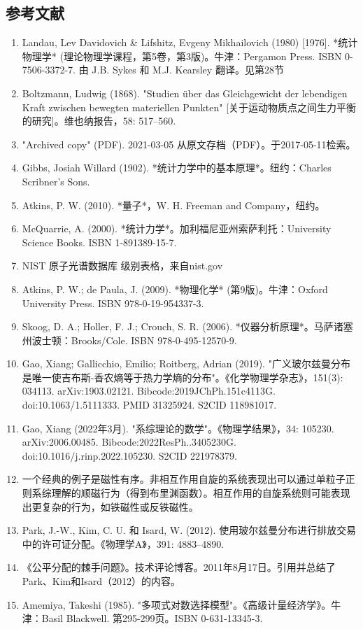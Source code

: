 \subsection{参考文献}  
\begin{enumerate}
\item Landau, Lev Davidovich & Lifshitz, Evgeny Mikhailovich (1980) [1976]. *统计物理学* (理论物理学课程，第5卷，第3版)。牛津：Pergamon Press. ISBN 0-7506-3372-7. 由 J.B. Sykes 和 M.J. Kearsley 翻译。见第28节  
\item Boltzmann, Ludwig (1868). "Studien über das Gleichgewicht der lebendigen Kraft zwischen bewegten materiellen Punkten" [关于运动物质点之间生力平衡的研究]。维也纳报告，58: 517–560.  
\item "Archived copy" (PDF). 2021-03-05 从原文存档（PDF）。于2017-05-11检索。  
\item Gibbs, Josiah Willard (1902). *统计力学中的基本原理*。纽约：Charles Scribner's Sons.  
\item Atkins, P. W. (2010). *量子*，W. H. Freeman and Company，纽约。  
\item McQuarrie, A. (2000). *统计力学*。加利福尼亚州索萨利托：University Science Books. ISBN 1-891389-15-7.  
\item NIST 原子光谱数据库 级别表格，来自nist.gov  
\item Atkins, P. W.; de Paula, J. (2009). *物理化学* (第9版)。牛津：Oxford University Press. ISBN 978-0-19-954337-3.  
\item Skoog, D. A.; Holler, F. J.; Crouch, S. R. (2006). *仪器分析原理*。马萨诸塞州波士顿：Brooks/Cole. ISBN 978-0-495-12570-9.
\item Gao, Xiang; Gallicchio, Emilio; Roitberg, Adrian (2019). "广义玻尔兹曼分布是唯一使吉布斯-香农熵等于热力学熵的分布"。《化学物理学杂志》，151(3): 034113. arXiv:1903.02121. Bibcode:2019JChPh.151c4113G. doi:10.1063/1.5111333. PMID 31325924. S2CID 118981017.  
\item Gao, Xiang (2022年3月). "系综理论的数学"。《物理学结果》，34: 105230. arXiv:2006.00485. Bibcode:2022ResPh..3405230G. doi:10.1016/j.rinp.2022.105230. S2CID 221978379.  
\item 一个经典的例子是磁性有序。非相互作用自旋的系统表现出可以通过单粒子正则系综理解的顺磁行为（得到布里渊函数）。相互作用的自旋系统则可能表现出更复杂的行为，如铁磁性或反铁磁性。  
\item Park, J.-W., Kim, C. U. 和 Isard, W. (2012). 使用玻尔兹曼分布进行排放交易中的许可证分配。《物理学A》，391: 4883–4890.
\item 《公平分配的棘手问题》。技术评论博客。2011年8月17日。引用并总结了Park、Kim和Isard（2012）的内容。  
\item Amemiya, Takeshi (1985). "多项式对数选择模型"。《高级计量经济学》。牛津：Basil Blackwell. 第295-299页。ISBN 0-631-13345-3.
\end{enumerate}